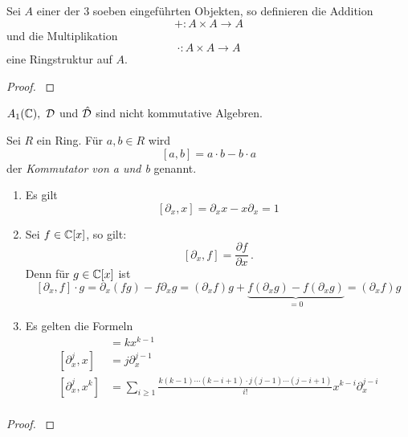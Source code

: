 \begin{comment}
Beispiele und Alternative Definition:\\
Sergey-Arkhipov-MAT1191\_Lecture\_Notes.pdf Chapter 2.1
\end{comment}

\begin{lem} %
Sei $A$ einer der 3 soeben eingeführten Objekten, so definieren die Addition 
\[ +:A\times A \rightarrow A \]
und die Multiplikation
\[ \cdot:A\times A \rightarrow A \]
eine Ringstruktur auf $A$.
\end{lem}
\begin{proof}
\cite[Kapittel 2 Section 1]{ZulaBarbara}
\end{proof}

\begin{rem}
$A_1(\mathbb{C}),~\mathcal{D}$ und $\hat{\mathcal{D}}$ sind nicht kommutative Algebren.
\end{rem}

\begin{defn}[Kommutator]%
Sei $R$ ein Ring. Für $a,b\in R$ wird
\[[a,b]=a\cdot b-b\cdot a\]
der \emph{Kommutator von a und b} genannt.
\end{defn}

\begin{prop} %
\begin{enumerate}
\item Es gilt
\[[ \partial_x,x] = \partial_xx-x\partial_x=1 \]
\item Sei $f\in \mathbb{C}[x]$, so gilt:
\[ [\partial_x,f] = \frac{\partial f}{\partial x} \,. \]
Denn für $g\in \mathbb{C}[x]$ ist
\[
[\partial_x,f]\cdot g=\partial_x(fg)-f\partial_xg=
  (\partial_xf)g+\underset{=0}{\underbrace{ 
  f(\partial_xg)-f(\partial_xg)}}=
  (\partial_xf)g
\]
\item Es gelten die Formeln\\
\begin{align*}
[\partial_x,x^k]   &= kx^{k-1}\\
[\partial_x^j,x]   &= j\partial_x^{j-1}\\
[\partial_x^j,x^k] &= \sum_{i\geq1}\frac{k(k-1)\cdots(k-i+1)
  \cdot j(j-1)\cdots(j-i+1)}{i!}x^{k-i}\partial_x^{j-i} \\
\end{align*}
\end{enumerate}
\end{prop}
\begin{proof}
\cite{ZulaBarbara}
\end{proof}

